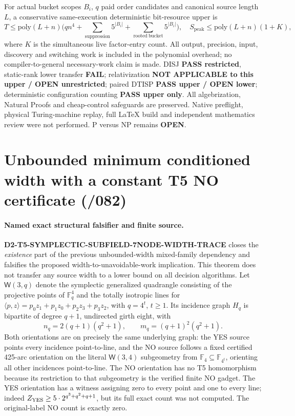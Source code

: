\documentclass[11pt]{article}
\begin{document}
For actual bucket scopes $B_i$, $q$ paid order candidates
and canonical source length $L$, a conservative
same-execution deterministic bit-resource upper is
\[
T\le\mathrm{poly}(L+n)\bigl(qn^4+
\sum_{\mathrm{suppression}}5^{|B_i|}
+\sum_{\mathrm{rooted\ bucket}}5^{|B_i|}\bigr),
\quad
S_{\mathrm{peak}}\le\mathrm{poly}(L+n)(1+K),
\]
where $K$ is the simultaneous live factor-entry count.
All output, precision, input, discovery and switching work
is included in the polynomial overhead; no compiler-to-general
necessary-work claim is made.  DISJ \textbf{PASS restricted},
static-rank lower transfer \textbf{FAIL}; relativization
\textbf{NOT APPLICABLE to this upper / OPEN unrestricted};
paired DTISP \textbf{PASS upper / OPEN lower}; deterministic
configuration counting \textbf{PASS upper only}. All
algebrization, Natural Proofs and cheap-control safeguards
are preserved.  Native preflight, physical Turing-machine replay,
full \LaTeX{} build and independent mathematics review were not
performed. P versus NP remains \textbf{OPEN}.

\section{Unbounded minimum conditioned width with a constant T5 NO certificate (/082)}
\paragraph{Named exact structural falsifier and finite source.}
\textbf{D2-T5-SYMPLECTIC-SUBFIELD-7NODE-WIDTH-TRACE} closes the
\emph{existence} part of the previous unbounded-width mixed-family
dependency and falsifies the proposed width-to-unavoidable-work
implication. This theorem does not transfer any source width to a lower
bound on all decision algorithms. Let $\mathsf W(3,q)$ denote the
symplectic generalized quadrangle consisting of the projective points
of $\mathbb F_q^4$ and the totally isotropic lines for
$\langle p,z\rangle=p_0z_1+p_1z_0+p_2z_3+p_3z_2$, with $q=4^t$,
$t\ge1$. Its incidence graph $H_q$ is bipartite of degree $q+1$,
undirected girth eight, with
\[
n_q=2(q+1)(q^2+1),\qquad m_q=(q+1)^2(q^2+1).
\]
Both orientations are on precisely the same underlying graph:
the YES source points every incidence point-to-line, and the NO
source follows a fixed certified 425-arc orientation on the literal
$\mathsf W(3,4)$ subgeometry from
$\mathbb F_4\subseteq\mathbb F_{4^t}$, orienting all other incidences
point-to-line. The NO orientation has no T5 homomorphism because its
restriction to that subgeometry is the verified finite NO gadget.
The YES orientation has a witness assigning zero to every point and
one to every line; indeed $Z_{\rm YES}\ge5\cdot2^{q^3+q^2+q+1}$,
but its full exact count was not computed. The original-label
NO count is exactly zero.
\end{document}
